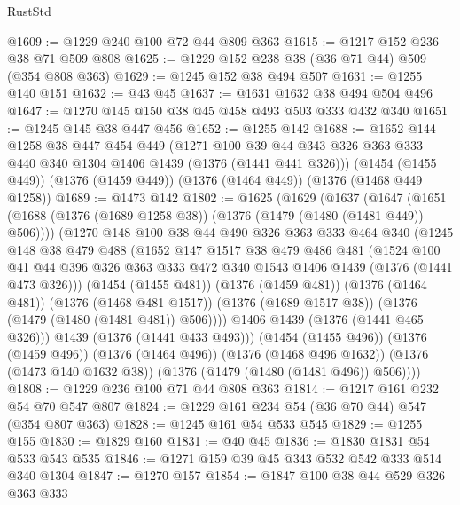 \begin{lexlean}{RustStd}
\begin{coremodule}
{\begin{coremodule}
{{{{{@1609 := @1229 @240 @100 @72 @44 @809 @363
@1615 := @1217 @152 @236 @38 @71 @509 @808
@1625 := @1229 @152 @238 @38 (@36 @71 @44) @509 (@354 @808 @363)
@1629 := @1245 @152 @38 @494 @507
@1631 := @1255 @140 @151
@1632 := @43 @45
@1637 := @1631 @1632 @38 @494 @504 @496
@1647 := @1270 @145 @150 @38 @45 @458 @493 @503 @333 @432 @340
@1651 := @1245 @145 @38 @447 @456
@1652 := @1255 @142
@1688 := @1652
    @144
    @1258
    @38
    @447
    @454
    @449
    (@1271 @100 @39 @44 @343 @326 @363 @333 @440 @340 @1304 @1406 @1439 (@1376 (@1441 @441 @326)))
    (@1454 (@1455 @449))
    (@1376 (@1459 @449))
    (@1376 (@1464 @449))
    (@1376 (@1468 @449 @1258))
@1689 := @1473 @142
@1802 := @1625
    (@1629
      (@1637
        (@1647
          (@1651 (@1688 (@1376 (@1689 @1258 @38)) (@1376 (@1479 (@1480 (@1481 @449)) @506))))
          (@1270
            @148
            @100
            @38
            @44
            @490
            @326
            @363
            @333
            @464
            @340
            (@1245
              @148
              @38
              @479
              @488
              (@1652
                @147
                @1517
                @38
                @479
                @486
                @481
                (@1524
                  @100
                  @41
                  @44
                  @396
                  @326
                  @363
                  @333
                  @472
                  @340
                  @1543
                  @1406
                  @1439
                  (@1376 (@1441 @473 @326)))
                (@1454 (@1455 @481))
                (@1376 (@1459 @481))
                (@1376 (@1464 @481))
                (@1376 (@1468 @481 @1517))
                (@1376 (@1689 @1517 @38))
                (@1376 (@1479 (@1480 (@1481 @481)) @506))))
            @1406
            @1439
            (@1376 (@1441 @465 @326)))
          @1439
          (@1376 (@1441 @433 @493)))
        (@1454 (@1455 @496))
        (@1376 (@1459 @496))
        (@1376 (@1464 @496))
        (@1376 (@1468 @496 @1632))
        (@1376 (@1473 @140 @1632 @38))
        (@1376 (@1479 (@1480 (@1481 @496)) @506))))
@1808 := @1229 @236 @100 @71 @44 @808 @363
@1814 := @1217 @161 @232 @54 @70 @547 @807
@1824 := @1229 @161 @234 @54 (@36 @70 @44) @547 (@354 @807 @363)
@1828 := @1245 @161 @54 @533 @545
@1829 := @1255 @155
@1830 := @1829 @160
@1831 := @40 @45
@1836 := @1830 @1831 @54 @533 @543 @535
@1846 := @1271 @159 @39 @45 @343 @532 @542 @333 @514 @340 @1304
@1847 := @1270 @157
@1854 := @1847 @100 @38 @44 @529 @326 @363 @333
}}}}}
\end{coremodule}}
\end{coremodule}
\end{lexlean}

